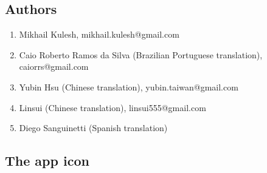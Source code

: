 \documentclass[DIV=calc, paper=a4, fontsize=11pt, twocolumn]{scrartcl}
\begin{document}
\subsection{Authors}

\begin{enumerate}
\item Mikhail Kulesh,
mikhail.kulesh@gmail.com

\item Caio Roberto Ramos da Silva
(Brazilian Portuguese translation),
caiorrs@gmail.com

\item Yubin Hsu
(Chinese translation),
yubin.taiwan@gmail.com

\item Linsui
(Chinese translation),
linsui555@gmail.com

\item Diego Sanguinetti
(Spanish translation)
\end{enumerate}

\subsection{The app icon}
\end{document}
